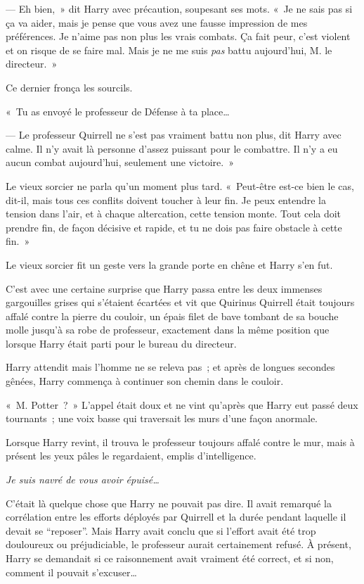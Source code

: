 --- Eh bien,~» dit Harry avec précaution, soupesant ses mots.
«~Je ne sais pas si ça va aider, mais je pense que vous avez une fausse impression de mes préférences.
Je n'aime pas non plus les vrais combats.
Ça fait peur, c'est violent et on risque de se faire mal.
Mais je ne me suis \emph{pas} battu aujourd'hui, M. le directeur.~»

Ce dernier fronça les sourcils.

«~Tu as envoyé le professeur de Défense à ta place…

--- Le professeur Quirrell ne s'est pas vraiment battu non plus, dit Harry avec calme.
Il n'y avait là personne d'assez puissant pour le combattre.
Il n'y a eu aucun combat aujourd'hui, seulement une victoire.~»

Le vieux sorcier ne parla qu'un moment plus tard.
«~Peut-être est-ce bien le cas, dit-il, mais tous ces conflits doivent toucher à leur fin.
Je peux entendre la tension dans l'air, et à chaque altercation, cette tension monte.
Tout cela doit prendre fin, de façon décisive et rapide, et tu ne dois pas faire obstacle à cette fin.~»

Le vieux sorcier fit un geste vers la grande porte en chêne et Harry s'en fut.

\later

C'est avec une certaine surprise que Harry passa entre les deux immenses gargouilles grises qui s'étaient écartées et vit que Quirinus Quirrell était toujours affalé contre la pierre du couloir, un épais filet de bave tombant de sa bouche molle jusqu'à sa robe de professeur, exactement dans la même position que lorsque Harry était parti pour le bureau du directeur.

Harry attendit mais l'homme ne se releva pas~; et après de longues secondes gênées, Harry commença à continuer son chemin dans le couloir.

«~M. Potter~?~»
L'appel était doux et ne vint qu'après que Harry eut passé deux tournants~; une voix basse qui traversait les murs d'une façon anormale.

Lorsque Harry revint, il trouva le professeur toujours affalé contre le mur, mais à présent les yeux pâles le regardaient, emplis d'intelligence.

\emph{Je suis navré de vous avoir épuisé…}

C'était là quelque chose que Harry ne pouvait pas dire.
Il avait remarqué la corrélation entre les efforts déployés par Quirrell et la durée pendant laquelle il devait se “reposer”.
Mais Harry avait conclu que si l'effort avait été trop douloureux ou préjudiciable, le professeur aurait certainement refusé.
À présent, Harry se demandait si ce raisonnement avait vraiment été correct, et si non, comment il pouvait s'excuser…

